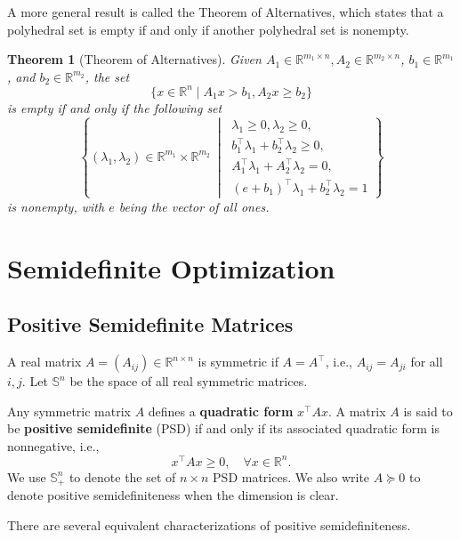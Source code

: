 \documentclass[
]{book}
\newtheorem{theorem}{Theorem}[chapter]
\theoremstyle{definition}
\theoremstyle{definition}
\theoremstyle{definition}
\theoremstyle{definition}
\theoremstyle{remark}
\begin{document}
A more general result is called the Theorem of Alternatives, which states that a polyhedral set is empty if and only if another polyhedral set is nonempty.

\begin{theorem}[Theorem of Alternatives]
\protect\hypertarget{thm:Alternative}{}\label{thm:Alternative}Given \(A_1 \in \mathbb{R}^{m_1 \times n}, A_2 \in \mathbb{R}^{m_2 \times n}\), \(b_1 \in \mathbb{R}^{m_1}\), and \(b_2 \in \mathbb{R}^{m_2}\), the set
\[
\{ x \in \mathbb{R}^{n} \mid A_1 x > b_1, A_2 x \geq b_2 \}
\]
is empty if and only if the following set
\[
 \left\{ (\lambda_1,\lambda_2) \in \mathbb{R}^{m_1} \times \mathbb{R}^{m_2}\ \middle\vert\ \begin{array}{r} \lambda_1 \geq 0, \lambda_2 \geq 0, \\ b_1^\top\lambda_1 + b_2^\top\lambda_2 \geq 0, \\ A_1^\top\lambda_1 + A_2^\top\lambda_2 = 0, \\ (e + b_1)^\top\lambda_1 + b_2^\top\lambda_2 = 1 \end{array}  \right\} 
\]
is nonempty, with \(e\) being the vector of all ones.
\end{theorem}

\hypertarget{sdp}{%
\chapter{Semidefinite Optimization}\label{sdp}}

\hypertarget{positive-semidefinite-matrices}{%
\section{Positive Semidefinite Matrices}\label{positive-semidefinite-matrices}}

A real matrix \(A = (A_{ij}) \in \mathbb{R}^{n \times n}\) is symmetric if \(A = A^\top\), i.e., \(A_{ij} = A_{ji}\) for all \(i,j\). Let \(\mathbb{S}^{n}\) be the space of all real symmetric matrices.

Any symmetric matrix \(A\) defines a \textbf{quadratic form} \(x^\top A x\). A matrix \(A\) is said to be \textbf{positive semidefinite} (PSD) if and only if its associated quadratic form is nonnegative, i.e.,
\[
x^\top A x \geq 0, \quad \forall x \in \mathbb{R}^{n}.
\]
We use \(\mathbb{S}^{n}_{+}\) to denote the set of \(n\times n\) PSD matrices. We also write \(A \succeq 0\) to denote positive semidefiniteness when the dimension is clear.

There are several equivalent characterizations of positive semidefiniteness.
\end{document}
